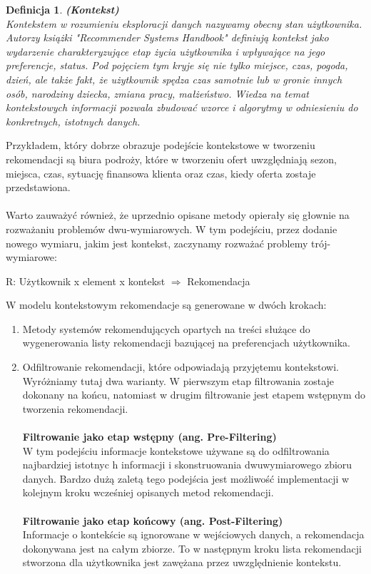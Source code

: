 \documentclass[12pt,a4paper]{report}
\newtheorem{df}{Definicja}
\begin{document}
\begin{df}\textbf{(Kontekst)}
\\Kontekstem w rozumieniu eksploracji danych nazywamy obecny stan użytkownika. Autorzy książki "Recommender Systems Handbook" definiują kontekst jako wydarzenie charakteryzujące etap życia użytkownika i wpływające na jego preferencje, status. Pod pojęciem tym kryje się nie tylko miejsce, czas, pogoda, dzień, ale także fakt, że użytkownik spędza czas samotnie lub w gronie innych osób, narodziny dziecka, zmiana pracy, małżeństwo. Wiedza na temat kontekstowych informacji pozwala zbudować wzorce i algorytmy w odniesieniu do konkretnych, istotnych danych.
\end{df}
Przykładem, który dobrze obrazuje podejście kontekstowe w tworzeniu rekomendacji są biura podroży, które w tworzeniu ofert uwzględniają sezon, miejsca, czas, sytuację finansowa klienta oraz czas, kiedy oferta zostaje przedstawiona. 
\\
\\Warto zauważyć również, że uprzednio opisane metody opierały się głownie na rozważaniu problemów dwu-wymiarowych. W tym podejściu, przez dodanie nowego wymiaru, jakim jest kontekst, zaczynamy rozważać problemy trój-wymiarowe:
\begin{center}
R: Użytkownik x element x kontekst $ \Rightarrow$ Rekomendacja
\end{center}
W modelu kontekstowym rekomendacje są generowane w dwóch krokach:
\begin{enumerate}
\item Metody systemów rekomendujących opartych na treści służące do wygenerowania listy rekomendacji bazującej na  preferencjach użytkownika.
\item Odfiltrowanie rekomendacji, które odpowiadają przyjętemu kontekstowi.
\\Wyróżniamy tutaj dwa warianty. W pierwszym etap filtrowania zostaje dokonany na końcu, natomiast w drugim filtrowanie jest etapem wstępnym do tworzenia rekomendacji.
\\
\\
\textbf{Filtrowanie jako etap wstępny (ang. Pre-Filtering)}
\\W tym podejściu informacje kontekstowe używane są do odfiltrowania najbardziej istotnyc    h informacji i skonstruowania dwuwymiarowego zbioru danych. Bardzo dużą zaletą tego podejścia jest możliwość implementacji w kolejnym kroku wcześniej opisanych metod rekomendacji. 
\\
\\ \textbf{Filtrowanie jako etap końcowy (ang. Post-Filtering)}
\\Informacje o kontekście są ignorowane w wejściowych danych, a rekomendacja dokonywana jest na całym zbiorze. To w następnym kroku lista rekomendacji stworzona dla użytkownika jest zawężana przez uwzględnienie kontekstu.
\end{enumerate}
\end{document}

